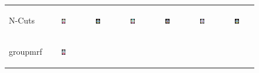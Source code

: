 \documentclass[runningheads,a4paper]{llncs}
\begin{document}
\begin{figure}[htb]
\begin{tabular}{lcc|cc|cc}
\begin{sideways} \footnotesize \textsf{N-Cuts} \end{sideways} &
\includegraphics[width=0.15\textwidth]{figure2/ncuts_grp_z25} &
\includegraphics[width=0.15\textwidth]{figure2/ncuts_grp_z32} &
\includegraphics[width=0.15\textwidth]{figure2/ncuts_sub1_z25} &
\includegraphics[width=0.15\textwidth]{figure2/ncuts_sub1_z32} &
\includegraphics[width=0.15\textwidth]{figure2/ncuts_sub2_z25} &
\includegraphics[width=0.15\textwidth]{figure2/ncuts_sub2_z32} \\
\begin{sideways} \footnotesize \textsf{groupmrf} \end{sideways} &
\includegraphics[width=0.15\textwidth]{figure2/mrf_grp_z25} &

\end{tabular}
\end{figure}
\end{document}
